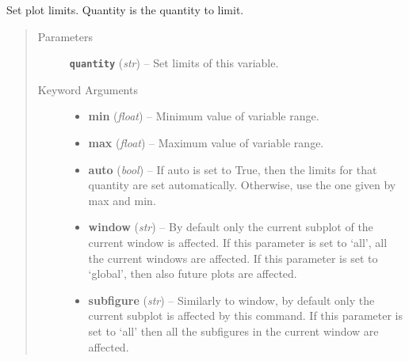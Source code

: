 \documentclass[letterpaper,10pt,english]{sphinxmanual}
\begin{document}
\begin{fulllineitems}
\label{index:facade.limit}
Set plot limits. Quantity is the quantity to limit.
\begin{quote}\begin{description}
\item[{Parameters}] \leavevmode
\textbf{\texttt{quantity}} (\emph{str}) -- Set limits of this variable.

\item[{Keyword Arguments}] \leavevmode\begin{itemize}
\item {} 
\textbf{min} (\emph{float}) --
Minimum value of variable range.

\item {} 
\textbf{max} (\emph{float}) --
Maximum value of variable range.

\item {} 
\textbf{auto} (\emph{bool}) --
If auto is set to True, then the limits for that quantity are
set automatically. Otherwise, use the one given by max and min.

\item {} 
\textbf{window} (\emph{str}) --
By default only the current subplot of the current window is affected.
If this parameter is set to `all', all the current windows are affected.
If this parameter is set to `global', then also future plots are affected.

\item {} 
\textbf{subfigure} (\emph{str}) --
Similarly to window, by default only the current subplot is affected
by this command. If this parameter is set to `all' then all the subfigures
in the current window are affected.

\end{itemize}

\end{description}\end{quote}

\end{fulllineitems}

\end{document}
